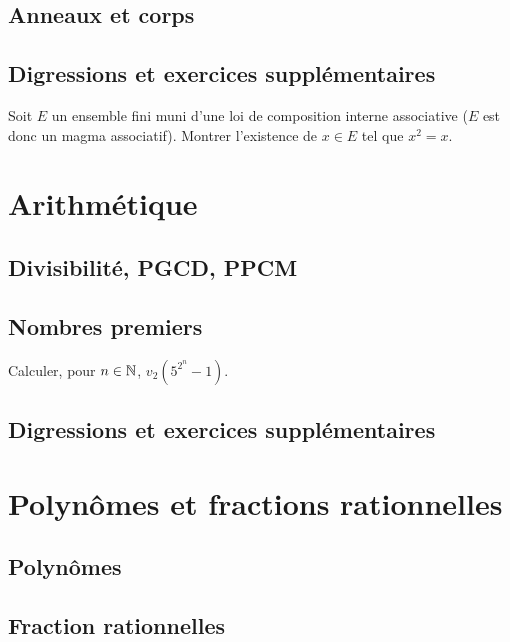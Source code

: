 \documentclass[12pt,a4paper]{exo_book}
\begin{document}
\section{Anneaux et corps}

\section{Digressions et exercices supplémentaires}

\begin{exo}
    Soit $E$ un ensemble fini muni d'une loi de composition interne associative ($E$ est donc un magma associatif). Montrer l'existence de $x \in E$ tel que $x^2 = x$.
\end{exo}

\chapter{Arithmétique}

\section{Divisibilité, PGCD, PPCM}

\section{Nombres premiers}

\begin{exo}
    Calculer, pour $n \in \mathbb{N}$, $v_2(5^{2^n} - 1)$.
\end{exo}

\section{Digressions et exercices supplémentaires}


\chapter{Polynômes et fractions rationnelles}

\section{Polynômes}

\section{Fraction rationnelles}
\end{document}
